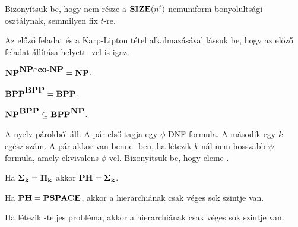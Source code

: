\begin{Exercise}[counter={sorszam}, difficulty=1]
Bizonyítsuk be, hogy  nem része a $\mbox{\ensuremath{\mathbf{SIZE}}}(n^t)$ nemuniform bonyolultsági
osztálynak, semmilyen fix $t$-re. 

\end{Exercise}


\begin{Exercise}[counter={sorszam}, difficulty=1]
Az előző feladat és a Karp-Lipton tétel alkalmazásával lássuk be, hogy az
előző feladat állítása  helyett \Sigmatwo-vel is igaz.

\end{Exercise}


\begin{Exercise}[counter={sorszam}, difficulty=0]
$\mbox{\ensuremath{\mathbf{NP}}}^{\mbox{\ensuremath{\mathbf{NP}}} \cap \mbox{\ensuremath{\mathbf{co\text{-}NP}}}} = \mbox{\ensuremath{\mathbf{NP}}}$.
\end{Exercise}


\begin{Exercise}[counter={sorszam}, difficulty=0]
$\mbox{\ensuremath{\mathbf{BPP}}}^{\mbox{\ensuremath{\mathbf{BPP}}}} = \mbox{\ensuremath{\mathbf{BPP}}}$.
\end{Exercise}


\begin{Exercise}[counter={sorszam}, difficulty=1]
$\mbox{\ensuremath{\mathbf{NP}}}^{\mbox{\ensuremath{\mathbf{BPP}}}} \subseteq \mbox{\ensuremath{\mathbf{BPP}}}^{\mbox{\ensuremath{\mathbf{NP}}}}$.
\end{Exercise}


\begin{Exercise}[counter={sorszam}, difficulty=0]
A  nyelv párokból áll. A pár első tagja egy $\phi$ DNF formula. A második egy $k$ egész szám.
A pár akkor van benne -ben, ha létezik $k$-nál nem hosszabb $\psi$ formula, amely ekvivalens $\phi$-vel.
Bizonyítsuk be, hogy  eleme \Sigmatwo.
\end{Exercise}


\begin{Exercise}[counter={sorszam}, difficulty=0]
Ha $\mbox{\ensuremath{\mathbf{\Sigma_k}}} = \mbox{\ensuremath{\mathbf{\Pi_k}}}$ akkor $\mbox{\ensuremath{\mathbf{PH}}} = \mbox{\ensuremath{\mathbf{\Sigma_k}}}$.
\end{Exercise}


\begin{Exercise}[counter={sorszam}, difficulty=0]
Ha $\mbox{\ensuremath{\mathbf{PH}}}=\mbox{\ensuremath{\mathbf{PSPACE}}}$, akkor a hierarchiának csak véges sok szintje van.
\end{Exercise}


\begin{Exercise}[counter={sorszam}, difficulty=0]
 Ha létezik \PH-teljes probléma, akkor a hierarchiának csak véges sok szintje van.
\end{Exercise}


